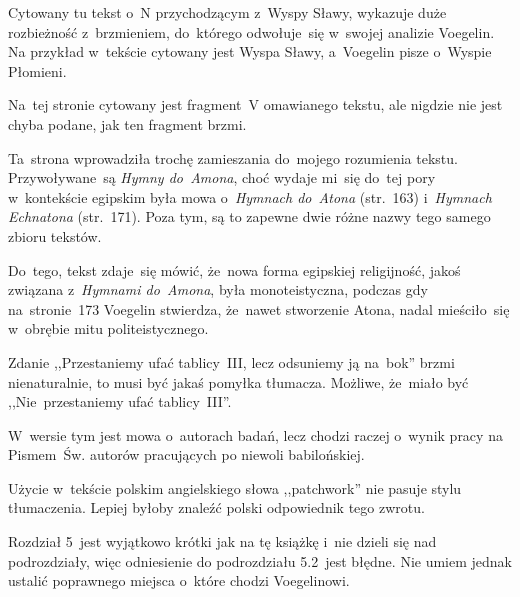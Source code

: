 \documentclass[a4paper,11pt]{article}
\begin{document}
\start {} Cytowany tu tekst o~N przychodzącym z~Wyspy Sławy,
wykazuje duże rozbieżność z~brzmieniem, do~którego odwołuje~się
w~swojej analizie Voegelin. Na przykład w~tekście cytowany jest Wyspa
Sławy, a~Voegelin pisze o~Wyspie Płomieni.

\vspace{\spaceFour}


\start {} Na~tej stronie cytowany jest fragment~V omawianego
tekstu, ale nigdzie nie jest chyba podane, jak ten fragment brzmi.

\vspace{\spaceFour}


\start {} Ta~strona wprowadziła trochę zamieszania do~mojego
rozumienia tekstu. Przywoływane~są \emph{Hymny do~Amona}, choć wydaje
mi~się do~tej pory w~kontekście egipskim była mowa o~\emph{Hymnach
  do~Atona} (str.~163) i~\emph{Hymnach Echnatona} (str.~171). Poza
tym, są to zapewne dwie różne nazwy tego samego zbioru tekstów.

Do~tego, tekst zdaje~się mówić, że~nowa forma egipskiej religijność,
jakoś związana z~\emph{Hymnami do~Amona}, była monoteistyczna, podczas
gdy na~stronie~173 Voegelin stwierdza, że~nawet stworzenie Atona,
nadal mieściło~się w~obrębie mitu politeistycznego.

\vspace{\spaceFour}


\start {} Zdanie ,,Przestaniemy ufać tablicy~III, lecz
odsuniemy ją na~bok'' brzmi nienaturalnie, to musi być jakaś pomyłka
tłumacza. Możliwe, że~miało być ,,Nie~przestaniemy ufać tablicy~III''.

\vspace{\spaceFour}


\start {} W~wersie tym jest mowa o~autorach badań, lecz
chodzi raczej o~wynik pracy na Pismem~Św. autorów pracujących po
niewoli babilońskiej.

\vspace{\spaceFour}


\start {} Użycie w~tekście polskim angielskiego słowa
,,patchwork'' nie pasuje stylu tłumaczenia. Lepiej byłoby znaleźć
polski odpowiednik tego zwrotu.

\vspace{\spaceFour}


\start {} Rozdział 5~jest wyjątkowo krótki jak na tę
książkę i~nie dzieli się nad podrozdziały, więc odniesienie do
podrozdziału 5.2~jest błędne. Nie umiem jednak ustalić poprawnego
miejsca o~które chodzi Voegelinowi.
\end{document}
